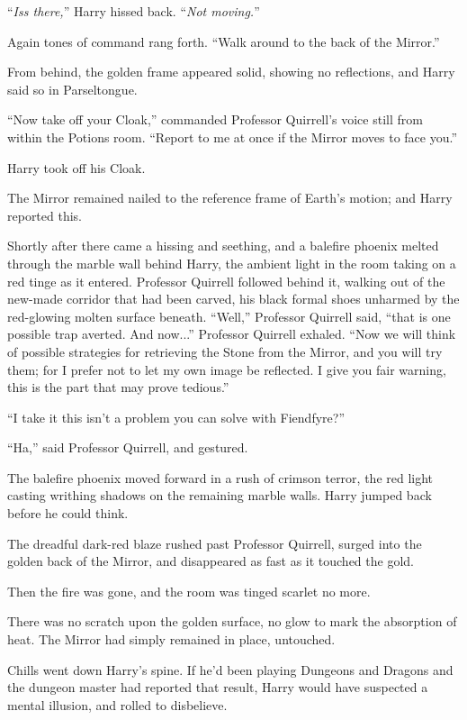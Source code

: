 ``\emph{Iss there,}'' Harry hissed back. ``\emph{Not moving.}''

Again tones of command rang forth. ``Walk around to the back of the Mirror.''

From behind, the golden frame appeared solid, showing no reflections, and Harry said so in Parseltongue.

``Now take off your Cloak,'' commanded Professor Quirrell's voice still from within the Potions room. ``Report to me at once if the Mirror moves to face you.''

Harry took off his Cloak.

The Mirror remained nailed to the reference frame of Earth's motion; and Harry reported this.

Shortly after there came a hissing and seething, and a balefire phoenix melted through the marble wall behind Harry, the ambient light in the room taking on a red tinge as it entered. Professor Quirrell followed behind it, walking out of the new-made corridor that had been carved, his black formal shoes unharmed by the red-glowing molten surface beneath. ``Well,'' Professor Quirrell said, ``that is one possible trap averted. And now...'' Professor Quirrell exhaled. ``Now we will think of possible strategies for retrieving the Stone from the Mirror, and you will try them; for I prefer not to let my own image be reflected. I give you fair warning, this is the part that may prove tedious.''

``I take it this isn't a problem you can solve with Fiendfyre?''

``Ha,'' said Professor Quirrell, and gestured.

The balefire phoenix moved forward in a rush of crimson terror, the red light casting writhing shadows on the remaining marble walls. Harry jumped back before he could think.

The dreadful dark-red blaze rushed past Professor Quirrell, surged into the golden back of the Mirror, and disappeared as fast as it touched the gold.

Then the fire was gone, and the room was tinged scarlet no more.

There was no scratch upon the golden surface, no glow to mark the absorption of heat. The Mirror had simply remained in place, untouched.

Chills went down Harry's spine. If he'd been playing Dungeons and Dragons and the dungeon master had reported that result, Harry would have suspected a mental illusion, and rolled to disbelieve.

